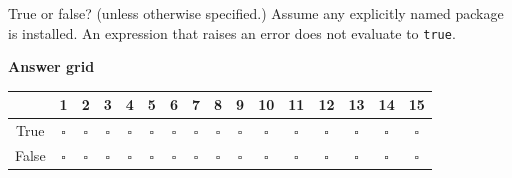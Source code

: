 \documentclass[a4paper]{article}
\newcommand{\julia}[1]{\texttt{#1}}
\begin{document}
True or false? (unless otherwise specified.)
Assume any explicitly named package is installed.
An expression that raises an error does not evaluate to \julia{true}.

\begin{center}
    \textbf{Answer grid}\par\smallskip
    \normalsize
    \renewcommand{\arraystretch}{1.35}
    \begin{tabular}{|c|*{15}{c|}}
        \hline
        & 1 & 2 & 3 & 4 & 5 & 6 & 7 & 8 & 9 & 10 & 11 & 12 & 13 & 14 & 15 \\
        \hline
        True & $\square$ & $\square$ & $\square$ & $\square$ & $\square$ & $\square$ & $\square$ & $\square$ & $\square$ & $\square$ & $\square$ & $\square$ & $\square$ & $\square$ & $\square$ \\
        False & $\square$ & $\square$ & $\square$ & $\square$ & $\square$ & $\square$ & $\square$ & $\square$ & $\square$ & $\square$ & $\square$ & $\square$ & $\square$ & $\square$ & $\square$ \\
        \hline
    \end{tabular}
\end{center}
\end{document}
